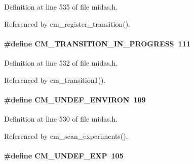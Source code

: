 \begin{DoxyItemize}
\item 
\end{DoxyItemize}

Definition at line 535 of file midas.h.

Referenced by cm\_\-register\_\-transition().
\paragraph[{CM\_\-TRANSITION\_\-IN\_\-PROGRESS}]{\setlength{\rightskip}{0pt plus 5cm}\#define CM\_\-TRANSITION\_\-IN\_\-PROGRESS~111}\hfill\label{group__err21_ga5eb422d9ad83d53c886a16a4691e7eb4}

\begin{DoxyItemize}
\item 
\end{DoxyItemize}

Definition at line 532 of file midas.h.

Referenced by cm\_\-transition1().
\paragraph[{CM\_\-UNDEF\_\-ENVIRON}]{\setlength{\rightskip}{0pt plus 5cm}\#define CM\_\-UNDEF\_\-ENVIRON~109}\hfill\label{group__err21_gaf3ff2980ad033cdeb6ed0bb53dfec41c}

\begin{DoxyItemize}
\item 
\end{DoxyItemize}

Definition at line 530 of file midas.h.

Referenced by cm\_\-scan\_\-experiments().
\paragraph[{CM\_\-UNDEF\_\-EXP}]{\setlength{\rightskip}{0pt plus 5cm}\#define CM\_\-UNDEF\_\-EXP~105}\hfill\label{group__err21_ga10f9c3f1a23d0f63f86edf36143c849d}

\begin{DoxyItemize}
\item 
\end{DoxyItemize}

